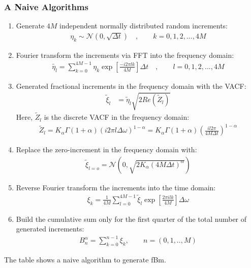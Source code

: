 \documentclass[
  a4paper,BCOR10mm,oneside,
  headsepline,footsepline,%
  fleqn,openbib
]{scrbook}
\begin{document}
\subsubsection{A Naive Algorithms}
\begin{table}
\begin{framed}
\begin{enumerate}
 \item Generate $4M$ independent normally distributed random increments: 
\begin{align}
 \eta_k \sim \mathcal{N}(0,\sqrt{\Delta t})\quad, \qquad k=0,1,2,...,4M 
\end{align}
\item Fourier transform the increments via FFT into the frequency domain:
\begin{align}
 \tilde{\eta_l}=\sum_{k=0}^{4M-1} \eta_k \exp\left[\frac{- i 2 \pi  l k }{4M}\right] \Delta t \quad , \qquad  l=0,1,2,...,4M  \label{eq:fouriertrans}
\end{align}

\item Generated fractional increments in the frequency domain with the VACF: 
 \begin{align}
   \tilde{\xi}_{l}&= \tilde{\eta}_l\sqrt{2 Re( \tilde{Z}_l)} \label{eq:problem} 
  \end{align}
 Here,  $ \tilde{Z}_l$ is the discrete VACF in the frequency domain:
  \begin{align}
   \tilde{Z}_l = K_{\alpha} \Gamma(1+\alpha)(i 2 \pi l \Delta \omega)^{1-\alpha} =  K_{\alpha} \Gamma(1+\alpha)\left( \frac{i l 2 \pi}{4 M \Delta t}\right)^{1-\alpha} 
 \end{align}
 
 \item Replace the zero-increment in the frequency domain with:
\begin{align}
 \tilde{\xi}_{l=o} = \mathcal{N}(0,\sqrt{2 K_{\alpha} (4 M \Delta t)^\alpha})
\end{align}
 \item Reverse Fourier transform the increments into the time domain:
 \begin{align}
 \xi_{k}= \frac{1}{4M} \sum_{l=0}^{4M-1}  \tilde{\xi}_l \exp\left[\frac{2 \pi i l k }{4M}\right] \Delta \omega
 \end{align}
 \item Build the cumulative sum only for the first quarter of the total number of generated increments: 
 \begin{align}
   B^{\alpha}_n= \sum^{n-1}_{k=0} \xi_k ,\qquad n=(0,1,..,M)
  \end{align}
\end{enumerate}
\end{framed}
\caption{The table shows a naive algorithm to generate fBm.}
\label{naivealgorithm}
 \end{table}
\end{document}
